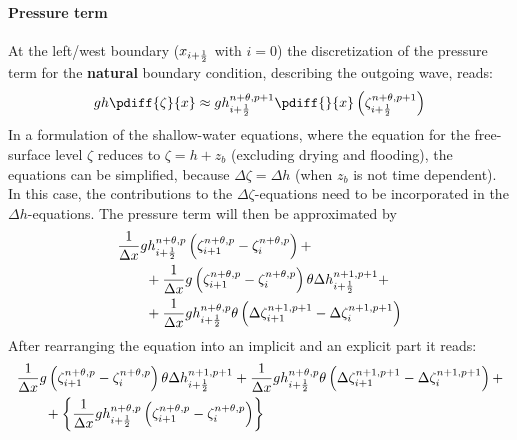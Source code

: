 \paragraph*{Pressure term}
At the left/west boundary ($x_{i+\frac{1}{2}}$ with $i=0$) the discretization of the pressure term for the \textbf{natural} boundary condition, describing the outgoing wave, reads:
\begin{align}
    gh \pdiff{\zeta}{x} \approx
g h^{n+\theta,p+1}_{i+\half} \pdiff{}{x} \left( \zeta^{n+\theta,p+1}_{i+\half}\right)
\end{align}
In a formulation of the shallow-water equations, where the equation for the free-surface level $\zeta$ reduces to $\zeta = h + z_b$ (excluding drying and flooding), the equations can be simplified, because $\Delta \zeta = \Delta h$ (when $z_b$ is not time dependent).
In this case, the contributions to the $\Delta \zeta$-equations need to be incorporated in the $\Delta h$-equations.
The pressure term will then be approximated by
\begin{align}
& \frac{1}{\Delta x} g h^{n+\theta,p}_{i+\frac{1}{2}} \left( \zeta^{n+\theta,p}_{i+1} - \zeta^{n+\theta,p}_{i}  \right) +
\nonumber \\*
& \qquad + \frac{1}{\Delta x}  g \left(  \zeta^{n+\theta,p}_{i+1} - \zeta^{n+\theta,p}_{i} \right) \theta \Delta h^{n+1, p+1}_{i+\frac{1}{2}} +
\nonumber \\*
& \qquad +   \frac{1}{\Delta x} g h^{n+\theta, p}_{i+\frac{1}{2}}
\theta  \left( \Delta \zeta^{n+1,p+1}_{i+1} - \Delta \zeta^{n+1,p+1}_{i}\right)
\end{align}
After rearranging the equation into an implicit and an explicit part it reads:
\begin{align}
& \frac{1}{\Delta x}  g \left(  \zeta^{n+\theta,p}_{i+1} - \zeta^{n+\theta,p}_{i} \right) \theta \Delta h^{n+1, p+1}_{i+\frac{1}{2}}
+ \frac{1}{\Delta x} g h^{n+\theta, p}_{i+\frac{1}{2}}
\theta \left( \Delta \zeta^{n+1,p+1}_{i+1}  - \Delta \zeta^{n+1,p+1}_{i}\right) +
\nonumber \\*
& \qquad + \left\{
\frac{1}{\Delta x} g h^{n+\theta,p}_{i+\frac{1}{2}} \left( \zeta^{n+\theta,p}_{i+1} - \zeta^{n+\theta,p}_{i}  \right)  \right\}
\end{align}

